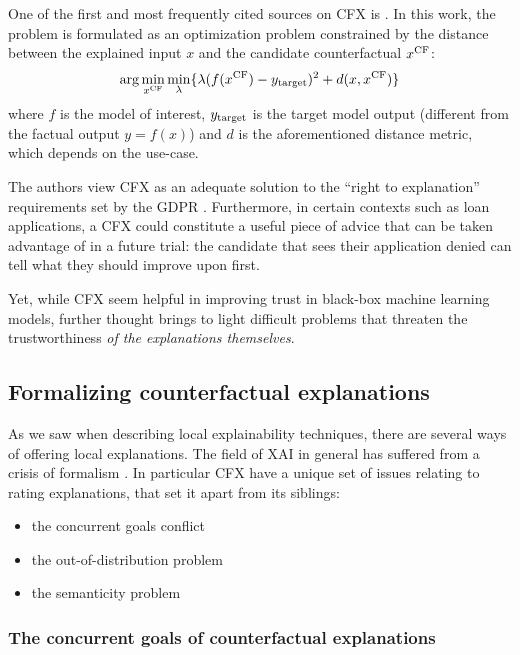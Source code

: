 \documentclass[../main.tex]{subfiles}
\begin{document}
One of the first and most frequently cited sources on CFX is \citeauthor{wachterCounterfactual2017} \cite{wachterCounterfactual2017}. In this work, the problem is formulated as an optimization problem constrained by the distance between the explained input $x$ and the candidate counterfactual $x^\mathrm{CF}$:
\begin{equation}
\arg\min_{x^\mathrm{CF}} \min_\lambda \{ \lambda (f(x^\mathrm{CF}) - y_{\mathrm{target}})^2 + d(x, x^\mathrm{CF}) \}
\end{equation}
where $f$ is the model of interest, $y_{\mathrm{target}}$ is the target model output (different from the factual output $y = f(x)$) and $d$ is the aforementioned distance metric, which depends on the use-case.

The authors view CFX as an adequate solution to the ``right to explanation'' requirements set by the GDPR \cite{kaminskiRight2018}.
Furthermore, in certain contexts such as loan applications, a CFX could constitute a useful piece of advice that can be taken advantage of in a future trial: the candidate that sees their application denied can tell what they should improve upon first.

Yet, while CFX seem helpful in improving trust in black-box machine learning models, further thought brings to light difficult problems that threaten the trustworthiness \emph{of the explanations themselves}.

\subsection{Formalizing counterfactual explanations}

As we saw when describing local explainability techniques, there are several ways of offering local explanations.
The field of XAI in general has suffered from a crisis of formalism \cite{liptonMythos2017, leavittFalsifiable2020}.
In particular CFX have a unique set of issues relating to rating explanations, that set it apart from its siblings:
\begin{itemize}
    \item the concurrent goals conflict
    \item the out-of-distribution problem
    \item the semanticity problem
\end{itemize}

\subsubsection{The concurrent goals of counterfactual explanations}
\end{document}
